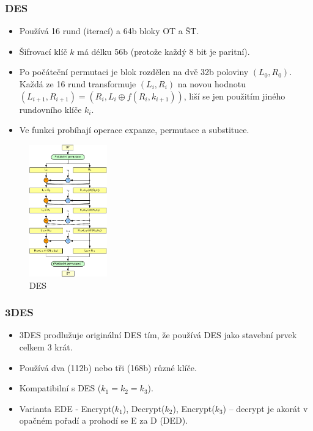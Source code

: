 \documentclass{szzclass}
\begin{document}
\subsubsection{DES}
\begin{itemize}
\item Používá 16 rund (iterací) a 64b bloky OT a ŠT.
\item Šifrovací klíč $k$ má délku 56b (protože každý 8 bit je paritní).
\item Po počáteční permutaci je blok rozdělen na dvě 32b poloviny $(L_0,R_0)$. Každá ze 16 rund transformuje $(L_i, R_i)$ na novou hodnotu $(L_{i+1},R_{i+1}) = (R_i, L_i \oplus f(R_i,k_{i+1}))$, liší se jen použitím jiného rundovního klíče $k_i$.
\item Ve funkci probíhají operace expanze, permutace a substituce.
\end{itemize}

\begin{figure}[!ht]
  \centering
  \includegraphics[width=0.3\textwidth]{topics/bi-spol-07/images/des}
  \caption{DES}
\end{figure}

\subsubsection{3DES}
\begin{itemize}
\item 3DES prodlužuje originální DES tím, že používá DES jako stavební prvek celkem 3 krát.
\item Používá dva (112b) nebo tři (168b) různé klíče.
\item Kompatibilní s DES ($k_1=k_2=k_3$).
\item Varianta EDE - Encrypt($k_1$), Decrypt($k_2$), Encrypt($k_3$) -- decrypt je akorát v opačném pořadí a prohodí se E za D (DED).
\end{itemize}
\end{document}
